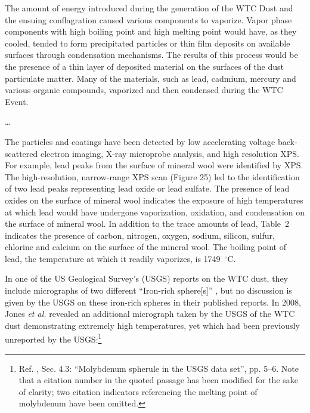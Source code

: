 \documentclass[letterpaper,12pt]{article}
\newenvironment{squotation}
  {\small\quotation}
  {\endquotation\normalsize}
\begin{document}
\begin{squotation}
The amount of energy introduced during the generation of the WTC Dust and the ensuing conflagration caused various components to vaporize. Vapor phase components with high boiling point and high melting point would have, as they cooled, tended to form precipitated particles or thin film deposits on available surfaces through condensation mechanisms. The results of this process would be the presence of a thin layer of deposited material on the surfaces of the dust particulate matter. Many of the materials, such as lead, cadmium, mercury and various organic compounds, vaporized and then condensed during the WTC Event.

\ldots

The particles and coatings have been detected by low accelerating voltage back-scattered electron imaging, X-ray microprobe analysis, and high resolution XPS. For example, lead peaks from the surface of mineral wool were identified by XPS. The high-resolution, narrow-range XPS scan (Figure 25) led to the identification of two lead peaks representing lead oxide or lead sulfate. The presence of lead oxides on the surface of mineral wool indicates the exposure of high temperatures at which lead would have undergone vaporization, oxidation, and condensation on the surface of mineral wool. In addition to the trace amounts of lead, Table~2 indicates the presence of carbon, nitrogen, oxygen, sodium, silicon, sulfur, chlorine and calcium on the surface of the mineral wool.
\end{squotation} The boiling point of lead, the temperature at which it readily vaporizes, is 1749~\( ^{\circ}\text{C} \).

In one of the US Geological Survey's (USGS) reports on the WTC dust, they include micrographs of two different ``Iron-rich sphere[s]'' \cite{USGSParticleAtlasWTC}, but no discussion is given by the USGS on these iron-rich spheres in their published reports. In 2008, Jones \emph{et al.} revealed an additional micrograph taken by the USGS of the WTC dust demonstrating extremely high temperatures, yet which had been previously unreported by the USGS:\footnote{Ref. , Sec. 4.3: ``Molybdenum spherule in the USGS data set'', pp. 5--6. Note that a citation number in the quoted passage has been modified for the sake of clarity; two citation indicators referencing the melting point of molybdenum have been omitted.}
\end{document}
